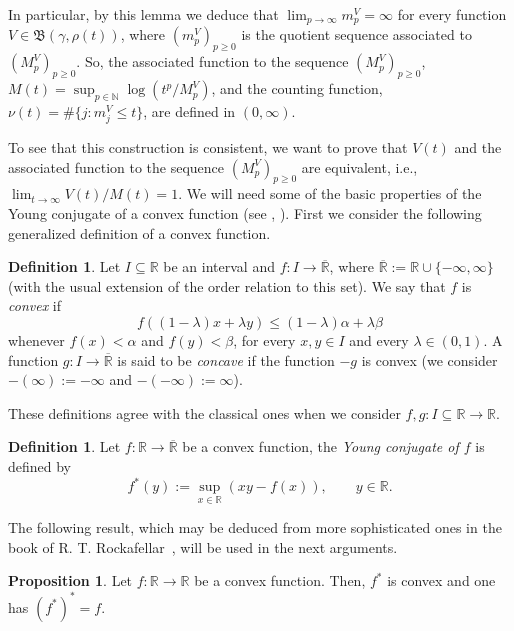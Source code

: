 \documentclass[11pt,a4paper]{article}
\theoremstyle{definition}
\newtheorem{pro}[theo]{Proposition}
\newtheorem{defi}[theo]{Definition}
\newenvironment{prop}{\smallskip\begin{pro}}{\end{pro}\smallskip}
\newenvironment{den}{\smallskip\begin{defi}}{\end{defi}\smallskip}
\def\oo{\infty}
\def\ri{\rightarrow}
\def\a{\alpha}
\def\b{\beta}
\def\ga{\gamma}
\def\ro{\rho}
\def\Bet{\mathfrak{B}}
\def\en{\subseteq}
\def\N{\mathbb{N}}
\def\R{\mathbb{R}}
\begin{document}
  In particular, by this lemma we deduce that $\lim_{p\ri\oo}m^V_p=\oo$ for every function $V \in \Bet(\ga, \ro(t) )$, where $(m^V_p)_{p\geq0}$
  is the quotient sequence associated to $(M^V_p)_{p\geq0}$. So,
 the associated function to the sequence $(M^V_p)_{p\geq0}$,  $M(t)=\sup_{p\in\N} \log (t^p/M^V_p)$,  and the counting
 function, $\nu(t)=\#\{j:m_j^V\le t\}$, are defined in $(0,\oo)$.

 To see that this construction is consistent, we want to prove that $V(t)$ and the associated function
 to the sequence $(M^V_p)_{p\geq0}$ are equivalent, i.e., $\lim_{t\ri\oo} V(t)/M(t)=1$. We will need some of the basic properties of the Young conjugate of a convex function  (see \cite{niculescu}, \cite{rockafellar}).
First we consider the following generalized definition of a convex function.


 \begin{den}\label{defConvex}
  Let $I\en\R$ be an interval and $f:I\ri\overline{\R}$, where $\overline{\R}:=\R\cup\{-\oo,\oo\}$ (with the usual extension of the order relation to this set).
  We say that $f$ is \textit{convex} if
  $$f((1-\lambda)x+\lambda y)\leq (1-\lambda)\a+\lambda \b $$
  whenever $f(x)<\a$ and $f(y)<\b$, for every $x,y\in I$ and every $\lambda\in(0,1)$. A function $g:I\ri\overline{\R}$ is said to be \textit{concave} if the function $-g$ is convex
  (we consider $-(\oo):=-\oo$ and $-(-\oo):=\oo$).
 \end{den}

These definitions agree with the classical ones when we consider $f,g:I\en\R\ri\R$.

 \begin{den}
  Let $f:\R\ri\overline{\R}$ be a convex function, the \textit{Young conjugate of $f$} is defined by
  $$f^*(y):=\sup_{x\in\R} (xy-f(x)), \qquad y\in\R.$$
 \end{den}

The following result, which may be deduced from more sophisticated ones in the book of R. T. Rockafellar~\cite[Ch.\ 7,\ 12]{rockafellar}, will be used in the next arguments.

 \begin{prop}\label{propdualconvexidadConjugadaYoung}
Let $f:\R\ri\R$ be a convex function. Then,  $f^*$ is convex and one has $(f^*)^*=f$.
\end{prop}
\end{document}
